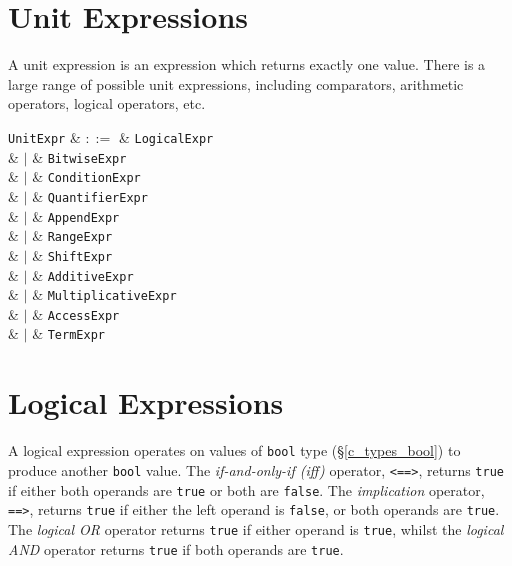 \section{Unit Expressions}
\label{c_expr_unit}

A unit expression is an expression which returns exactly one value.  There is a large range of possible unit expressions, including comparators, arithmetic operators, logical operators, etc.

\begin{syntax}
  \verb+UnitExpr+ & $::=$ & \verb+LogicalExpr+\\
                  &  $|$  & \verb+BitwiseExpr+\\
                  &  $|$  & \verb+ConditionExpr+\\
                  &  $|$  & \verb+QuantifierExpr+\\
                  &  $|$  & \verb+AppendExpr+\\
                  &  $|$  & \verb+RangeExpr+\\
                  &  $|$  & \verb+ShiftExpr+\\
                  &  $|$  & \verb+AdditiveExpr+\\
                  &  $|$  & \verb+MultiplicativeExpr+\\
                  &  $|$  & \verb+AccessExpr+\\
                  &  $|$  & \verb+TermExpr+\\
                
\end{syntax}


\section{Logical Expressions}
\label{c_expr_logical}

A logical expression operates on values of \lstinline{bool} type (\S\ref{c_types_bool}) to produce another \lstinline{bool} value.  The {\em if-and-only-if (iff)} operator, \lstinline{<==>}, returns \lstinline{true} if either both operands are \lstinline{true} or both are \lstinline{false}.  The {\em implication} operator, \lstinline{==>}, returns \lstinline{true} if either the left operand is \lstinline{false}, or both operands are \lstinline{true}.  The {\em logical OR} operator returns \lstinline{true} if either operand is \lstinline{true}, whilst the {\em logical AND} operator returns \lstinline{true} if both operands are \lstinline{true}.

